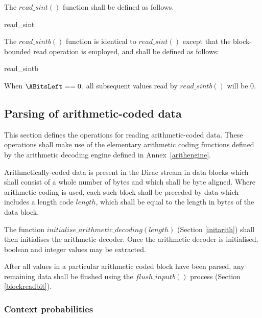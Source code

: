 The $read\_sint()$ function shall be defined as follows.

\begin{pseudo}{read\_sint}{}
  \bsEND
\bsEND
{}
\end{pseudo}

The $read\_sintb()$ function is identical to $read\_sint()$ except that the block-bounded read
operation is employed, and shall be defined as follows:

\begin{pseudo}{read\_sintb}{}
  \bsEND
\bsEND
{}
\end{pseudo}

\begin{informative} When $\ABitsLeft==0$, all subsequent values read by $read\_sintb()$ will be 0.\end{informative}

\subsection{Parsing of arithmetic-coded data}

\label{arithdecoding}

This section defines the operations for reading arithmetic-coded
data. These operations shall  make use of the elementary arithmetic coding functions 
defined by the arithmetic decoding engine defined in Annex~\ref{arithengine}.

Arithmetically-coded data is present in the Dirac stream in data blocks which shall consist of
a whole number of bytes and which shall be byte aligned. Where arithmetic coding is used, each such
block shall be preceded by data which includes a length code $length$, which shall be equal to the length in
bytes of the data block. 

The function $initialise\_arithmetic\_decoding(length)$
(Section \ref{initarith}) shall then initialises the arithmetic decoder. Once the arithmetic
decoder is initialised, boolean and integer values may be extracted.

After all values in a particular arithmetic coded block have been parsed, any remaining data
shall be flushed using the $flush\_inputb()$ process (Section \ref{blockreadbit}).

\subsubsection{Context probabilities}
\label{contextprobs}

